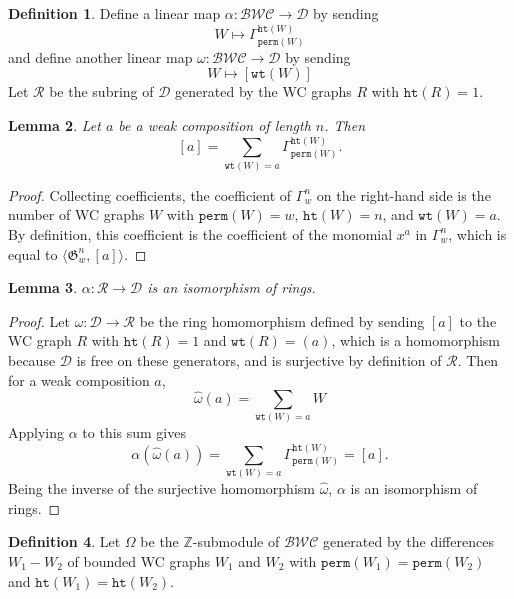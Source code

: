 \documentclass{amsart}
\newtheorem{lemma}{Lemma}[section]
\theoremstyle{definition}
\newtheorem{definition}[lemma]{Definition}
\theoremstyle{remark}
\numberwithin{equation}{subsection}
\newcommand{\wof}[1]{\mathtt{perm}(#1)}
\newcommand{\wtt}{\mathtt{wt}}
\newcommand{\hr}{\mathtt{ht}}
\newcommand{\BWC}{\mathcal{BWC}}
\newcommand{\groth}{\mathfrak{G}}
\newcommand{\dgroth}{\ensuremath{\Gamma}}
\newcommand{\dcoma}{\mathcal{D}}
\begin{document}
\begin{definition}
Define a linear map $\alpha:\BWC\to\dcoma$ by sending
$$W\mapsto \dgroth_{\wof{W}}^{\hr(W)}$$
and define another linear map $\omega:\BWC\to\dcoma$ by sending
$$W\mapsto [\wtt(W)]$$
Let $\mathcal{R}$ be the subring of $\dcoma$ generated by the WC graphs $R$ with $\hr(R)=1$.
\end{definition}

\begin{lemma}
Let $a$ be a weak composition of length $n$. Then
$$[a] = \sum_{\wtt(W)=a}\dgroth_{\wof{W}}^{\hr(W)}.$$
\end{lemma}
\begin{proof}
Collecting coefficients, the coefficient of $\dgroth_w^n$ on the right-hand side is the number of WC graphs $W$ with $\wof{W}=w$, $\hr(W)=n$, and $\wtt(W)=a$. By definition, this coefficient is the coefficient of the monomial $x^a$ in $\dgroth_w^n$, which is equal to $\langle \groth_w^n, [a]\rangle$.
\end{proof}

\begin{lemma}
$\alpha:\mathcal{R}\to \dcoma$ is an isomorphism of rings.
\end{lemma}
\begin{proof}
Let $\widehat{\omega}:\dcoma\to \mathcal{R}$ be the ring homomorphism defined by sending $[a]$ to the WC graph $R$ with $\hr(R)=1$ and $\wtt(R)=(a)$, which is a homomorphism because $\dcoma$ is free on these generators, and is surjective by definition of $\mathcal{R}$. Then for a weak composition $a$,
$$\widehat{\omega}(a) = \sum_{\wtt(W)=a}W$$
Applying $\alpha$ to this sum gives
$$\alpha(\widehat{\omega}(a)) = \sum_{\wtt(W)=a}\dgroth_{\wof{W}}^{\hr(W)} = [a].$$
Being the inverse of the surjective homomorphism $\widehat{\omega}$, $\alpha$ is an isomorphism of rings.
\end{proof}

\begin{definition}
Let $\Omega$ be the $\mathbb{Z}$-submodule of $\BWC$ generated by the differences $W_1-W_2$ of bounded WC graphs $W_1$ and $W_2$ with $\wof{W_1}=\wof{W_2}$ and $\hr(W_1)=\hr(W_2)$.
\end{definition}
\end{document}
